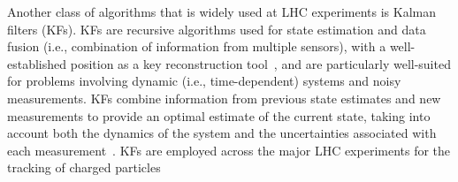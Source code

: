 
Another class of algorithms that is widely used at LHC experiments is Kalman filters (KFs). KFs are recursive algorithms used for state estimation and data fusion (i.e., combination of information from multiple sensors), with a well-established position as a key reconstruction tool~\cite{kalman-track}, and are particularly well-suited for problems involving dynamic (i.e.,  time-dependent) systems and noisy measurements. KFs combine information from previous state estimates and new measurements to provide an optimal estimate of the current state, taking into account both the dynamics of the system and the uncertainties associated with each measurement~\cite{FRUHWIRTH1987444}. KFs are employed across the major LHC experiments for the tracking of charged particles~\cite{Belikov:2003yr,ATLAS:tracking,CMS:tracking,LHCb_Allen_GPU}